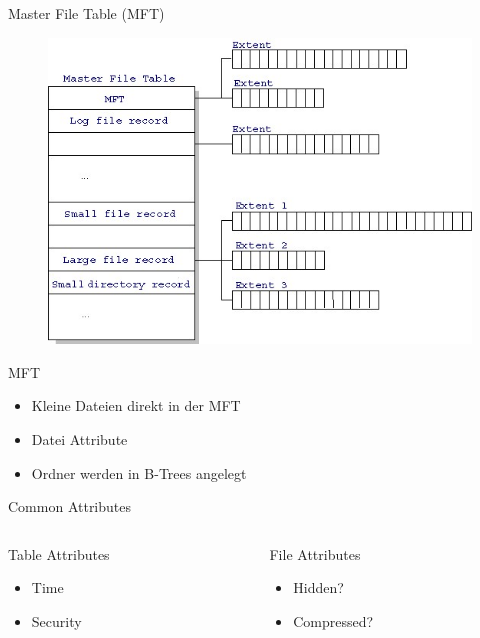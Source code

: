 \documentclass[12pt]{beamer}
\begin{document}
\begin{frame}{Master File Table (MFT)}
\begin{figure}
\includegraphics[scale=.7]{mft.jpg}
\end{figure}
\end{frame}

\begin{frame}{MFT}
\begin{itemize}
\item Kleine Dateien direkt in der MFT
\item Datei Attribute
\item Ordner werden in B-Trees angelegt
\end{itemize}
\end{frame}

\begin{frame}{Common Attributes}
\begin{columns}
\begin{column}{0.5\textwidth}
\large Table Attributes
\begin{itemize}
\item Time
\item Security
\end{itemize}
\end{column}
\begin{column}{0.5\textwidth}
\large File Attributes
\begin{itemize}
\item Hidden?
\item Compressed?
\end{itemize}
\end{column}
\end{columns}
\end{frame}
\end{document}
